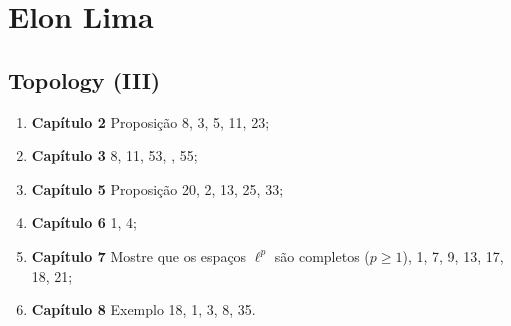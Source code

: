 \documentclass[latin,20pt]{article}
\begin{document}
  \section*{Elon Lima}
  \subsection*{Topology (III)} 
   \begin{enumerate}
    \item {\bf Capítulo 2} Proposição 8, 3, 5, 11, 23;
    \item {\bf Capítulo 3} 8, 11, 53, , 55;
    \item {\bf Capítulo 5} Proposição 20, 2, 13, 25, 33;
    \item {\bf Capítulo 6} 1, 4;
    \item {\bf Capítulo 7} Mostre que os espaços $\ell^{p}$ são completos ($p\geq 1$), 1, 7, 9, 13, 17, 18, 21; 
    \item {\bf Capítulo 8} Exemplo 18, 1, 3, 8, 35.
    \end{enumerate}
\end{document}
